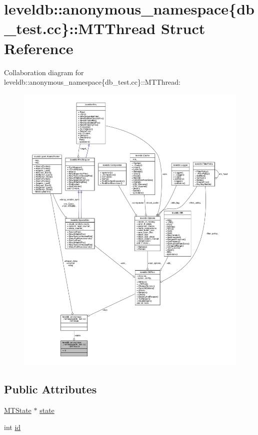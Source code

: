 \hypertarget{structleveldb_1_1anonymous__namespace_02db__test_8cc_03_1_1_m_t_thread}{}\section{leveldb\+:\+:anonymous\+\_\+namespace\{db\+\_\+test.\+cc\}\+:\+:M\+T\+Thread Struct Reference}
\label{structleveldb_1_1anonymous__namespace_02db__test_8cc_03_1_1_m_t_thread}


Collaboration diagram for leveldb\+:\+:anonymous\+\_\+namespace\{db\+\_\+test.\+cc\}\+:\+:M\+T\+Thread\+:
\nopagebreak
\begin{figure}[H]
\begin{center}
\leavevmode
\includegraphics[width=350pt]{structleveldb_1_1anonymous__namespace_02db__test_8cc_03_1_1_m_t_thread__coll__graph}
\end{center}
\end{figure}
\subsection*{Public Attributes}
\begin{DoxyCompactItemize}
\item 
\hyperlink{structleveldb_1_1anonymous__namespace_02db__test_8cc_03_1_1_m_t_state}{M\+T\+State} $\ast$ \hyperlink{structleveldb_1_1anonymous__namespace_02db__test_8cc_03_1_1_m_t_thread_ab1f576fac58c16544b3425aa8fccad52}{state}
\item 
int \hyperlink{structleveldb_1_1anonymous__namespace_02db__test_8cc_03_1_1_m_t_thread_a012815d7d94cdcae2f6e569f7faaa70f}{id}
\end{DoxyCompactItemize}


